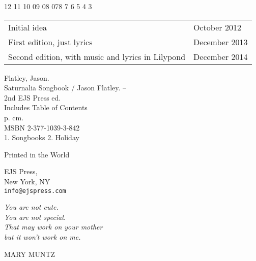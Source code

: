 \documentclass{memoir}
\newlength\longest
\begin{document}
\begin{center}
 12 11 10 09 08 07\hspace{2em}8 7 6 5 4 3 %
\end{center}

\begin{center}
\begin{tabular}{ll}
Initial idea  & October 2012 \\
First edition,  just lyrics & December 2013 \\
Second edition, with music and lyrics in Lilypond & December 2014 
\end{tabular}
\end{center}

\vfill

Flatley, Jason.\\
\hspace*{2em} Saturnalia Songbook / Jason Flatley. -- \\
\hspace*{2em} 2nd EJS Press ed. \\
\hspace*{2em} Includes Table of Contents \\
\hspace*{2em} p.  \hspace*{2em} cm. \\
\hspace*{2em} MSBN 2-377-1039-3-842 \\
\hspace*{2em} 1. Songbooks \hspace*{2em} 2. Holiday


\vfill

Printed in the World

EJS Press, \\
New York, NY \\
\texttt{info@ejspress.com}



\clearpage

\thispagestyle{empty}
\null\vfill

\settowidth{}

\selectfont

\centering
\parbox{370pt}{
  \raggedright{\huge\itshape
   You are not cute. \\ 
  You are not special.  \\
  That may work on your mother \\ 
  but it won't work on me.\par\bigskip
  }   
  \raggedleft\Large\MakeUppercase{Mary Muntz}\par

\vspace{40mm}
}
\end{document}
